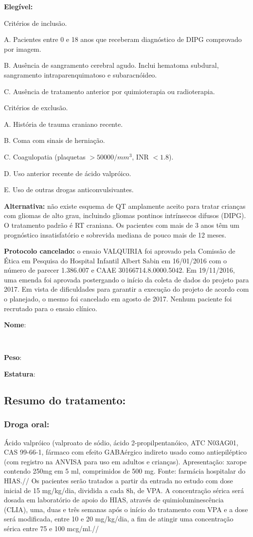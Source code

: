 \documentclass[11pt,a4paper,oldfontcommands]{memoir}
\def\entrywithlabel[#1]#2{\parbox{#1}{{\small #2:} \hrulefill}}
\begin{document}
\textbf{Elegível:} 

Critérios de inclusão.

A. Pacientes entre 0 e 18 anos que receberam diagnóstico de DIPG
comprovado por imagem.

B. Ausência de sangramento cerebral agudo. Inclui hematoma subdural,
sangramento intraparenquimatoso e subaracnóideo.

C. Ausência de tratamento anterior por quimioterapia ou radioterapia.

Critérios de exclusão.

A. História de trauma craniano recente.

B. Coma com sinais de herniação.

C. Coagulopatia (plaquetas $> 50000/mm^3$, INR $< 1.8$).

D. Uso anterior recente de ácido valpróico.

E. Uso de outras drogas anticonvulsivantes.

\textbf{Alternativa:} não existe esquema de QT amplamente aceito para tratar crianças com gliomas de alto grau, incluindo gliomas pontinos intrínsecos difusos (DIPG). O tratamento padrão é RT craniana. Os pacientes com mais de 3 anos têm um prognóstico insatisfatório e sobrevida mediana de pouco mais de 12 meses.

\textbf{Protocolo cancelado:} o ensaio VALQUIRIA foi aprovado pela Comissão de Ética em Pesquisa do Hospital Infantil Albert Sabin em 16/01/2016 com o número de parecer 1.386.007 e CAAE 30166714.8.0000.5042. Em 19/11/2016, uma emenda foi aprovada postergando o início da coleta de dados do projeto para 2017. Em vista de dificuldades para garantir a execução do projeto de acordo com o planejado, o mesmo foi cancelado em agosto de 2017. Nenhum paciente foi recrutado para o ensaio clínico.
 
\pagebreak
    \noindent
\entrywithlabel[1\hsize]{\textbf{Nome}}\hfill
\\[0.3cm]
\entrywithlabel[.45\hsize]{\textbf{Peso}}\hfill  \entrywithlabel[.45\hsize]{\textbf{Estatura}}

\subsection{Resumo do tratamento:}
\subsubsection{Droga oral:}
Ácido valpróico (valproato de sódio, ácido
2-propilpentanóico, ATC N03AG01, CAS 99-66-1, fármaco com efeito
GABAérgico indireto usado como antiepiléptico (com registro na ANVISA
para uso em adultos e crianças). Apresentação: xarope contendo 250mg em
5 ml, comprimidos de 500 mg. Fonte: farmácia hospitalar do HIAS.//
Os pacientes serão tratados a partir da entrada no estudo com dose
inicial de 15 mg/kg/dia, dividida a cada 8h, de VPA. A concentração
sérica será dosada em laboratório de apoio do HIAS, através de
quimioluminescência (CLIA), uma, duas e três semanas após o início do
tratamento com VPA e a dose será modificada, entre 10 e 20 mg/kg/dia, a
fim de atingir uma concentração sérica entre 75 e 100 mcg/ml.//
\end{document}
